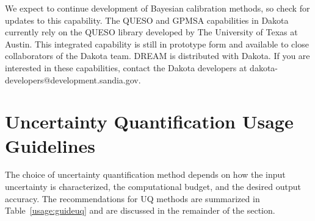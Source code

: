 We expect to continue development of Bayesian calibration methods, 
so check for updates to this capability. The QUESO and GPMSA capabilities
in Dakota currently rely on the QUESO library developed by The University of 
Texas at Austin. This integrated capability is still in prototype form and 
available to close collaborators of the Dakota team.  DREAM is distributed 
with Dakota.
If you are interested in these capabilities, contact the Dakota developers at  
dakota-developers@development.sandia.gov.
  
\section{Uncertainty Quantification Usage Guidelines }\label{usage:uq}

The choice of uncertainty quantification method depends on how the
input uncertainty is characterized, the computational budget, and the
desired output accuracy.  The recommendations for UQ methods are
summarized in Table~\ref{usage:guideuq} and are discussed in the
remainder of the section.

